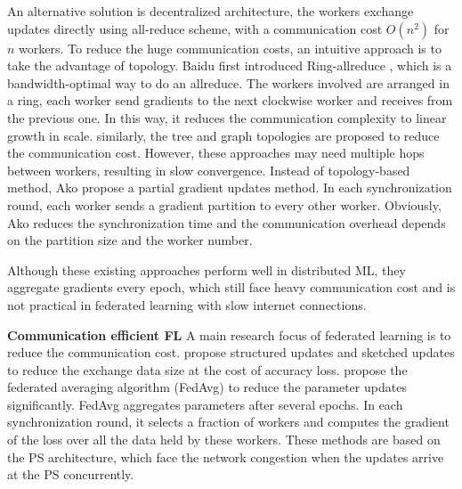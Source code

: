 An alternative solution is decentralized architecture, the workers exchange updates directly using all-reduce scheme, with a communication cost $O(n^2)$ for $n$ workers. To reduce the huge communication costs, an intuitive approach is to take the advantage of topology. Baidu first introduced Ring-allreduce \cite{allreduce}, which is a bandwidth-optimal way to do an allreduce. The workers involved are arranged in a ring, each worker send gradients to the next clockwise worker and receives from the previous one. In this way, it reduces the communication complexity to linear growth in scale. similarly, the tree \cite{li2015malt:} and graph \cite{agarwal2014a} topologies are proposed to reduce the communication cost. However, these approaches may need multiple hops between workers, resulting in slow convergence. Instead of topology-based method, Ako \cite{watcharapichat2016ako:} propose a partial gradient updates method. In each synchronization round, each worker sends a gradient partition to every other worker. Obviously, Ako reduces the synchronization time and the communication overhead depends on the partition size and the worker number. 
 
Although these existing approaches perform well in distributed ML, they aggregate gradients every epoch, which still face heavy communication cost and is not practical in federated learning with slow internet connections. 

 

\textbf{Communication efficient FL} 
A main research focus of federated learning is to reduce the communication cost. \cite{konevcny2016federated} propose structured updates and sketched updates to reduce the exchange data size at the cost of accuracy loss. \cite{McMahan2017FL} propose the federated averaging algorithm (FedAvg) to reduce the parameter updates significantly. FedAvg aggregates parameters after several epochs. In each synchronization round, it selects a fraction of workers and computes the gradient of the loss over all the data held by these workers. These methods are based on the PS architecture, which face the network congestion when the updates arrive at the PS concurrently.  


